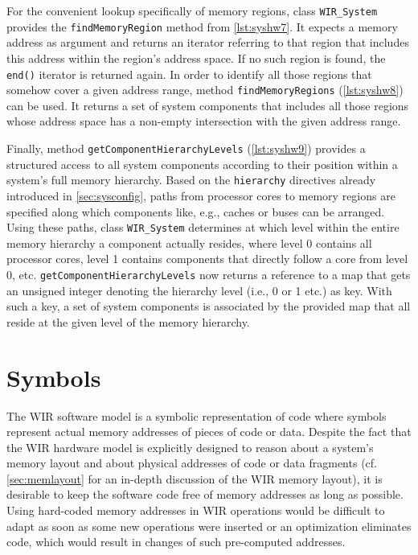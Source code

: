 For the convenient lookup specifically of memory regions, class \texttt{WIR\_System} provides the \texttt{findMemoryRegion} method from \cref{lst:syshw7}.
It expects a memory address as argument and returns an iterator referring to that region that includes this address within the region's address space.
If no such region is found, the \texttt{end()} iterator is returned again.
In order to identify all those regions that somehow cover a given address range, method \texttt{findMemoryRegions} (\cref{lst:syshw8}) can be used.
It returns a set of system components that includes all those regions whose address space has a non-empty intersection with the given address range.

Finally, method \texttt{getComponentHierarchyLevels} (\cref{lst:syshw9}) provides a structured access to all system components according to their position within a system's full memory hierarchy.
Based on the \texttt{hierarchy} directives already introduced in \cref{sec:sysconfig}, paths from processor cores to memory regions are specified along which components like, e.g., caches or buses can be arranged.
Using these paths, class \texttt{WIR\_System} determines at which level within the entire memory hierarchy a component actually resides, where level 0 contains all processor cores, level 1 contains components that directly follow a core from level 0, etc.
\texttt{getComponentHierarchyLevels} now returns a reference to a map that gets an unsigned integer denoting the hierarchy level (i.e., 0 or 1 etc.) as key.
With such a key, a set of system components is associated by the provided map that all reside at the given level of the memory hierarchy.


\section{Symbols}
\label{sec:symbols}

The \gls{WIR} software model is a symbolic representation of code where symbols represent actual memory addresses of pieces of code or data.
Despite the fact that the \gls{WIR} hardware model is explicitly designed to reason about a system's memory layout and about physical addresses of code or data fragments (cf. \cref{sec:memlayout} for an in-depth discussion of the \gls{WIR} memory layout), it is desirable to keep the software code free of memory addresses as long as possible.
Using hard-coded memory addresses in \gls{WIR} operations would be difficult to adapt as soon as some new operations were inserted or an optimization eliminates code, which would result in changes of such pre-computed addresses.

